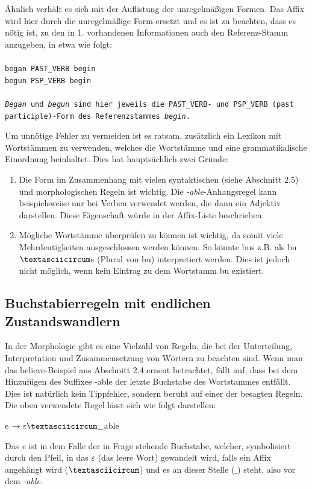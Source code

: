 \documentclass[12pt]{report}
\begin{document}
Ähnlich verhält es sich mit der Auflistung der unregelmäßigen Formen. Das Affix wird hier durch die unregelmäßige Form ersetzt und es ist zu beachten, dass es nötig ist, zu den in 1. vorhandenen Informationen auch den Referenz-Stamm anzugeben, in etwa wie folgt:
\\
\tt\\
began PAST\_VERB begin\\
begun PSP\_VERB begin\\
\rm\\
\textit{\glqq  Began\grqq{}} und \textit{\glqq  begun\grqq{}} sind hier jeweils die \glqq  PAST\_VERB\grqq{}- und \glqq  PSP\_VERB\grqq{} (past participle)-Form des Referenzstammes \textit{\glqq  begin\grqq{}}.

Um unnötige Fehler zu vermeiden ist es ratsam, zusätzlich ein Lexikon mit Wortstämmen zu verwenden, welches die Wortstämme und eine grammatikalische Einordnung beinhaltet. Dies hat hauptsächlich zwei Gründe: 

\begin{enumerate}
\item Die Form im Zusammenhang mit vielen syntaktischen (siehe Abschnitt 2.5) und morphologischen Regeln ist wichtig. Die \textit{\glqq  -able\grqq{}}-Anhangsregel kann beispielsweise nur bei Verben verwendet werden, die dann ein Adjektiv darstellen. Diese Eigenschaft würde in der Affix-Liste beschrieben.
\item Mögliche Wortstämme überprüfen zu können ist wichtig, da somit viele Mehrdeutigkeiten ausgeschlossen werden können. So könnte \glqq  bus\grqq{} z.B. als \glqq  bu$\textasciicircum$s\grqq{} (Plural von \glqq  bu\grqq{}) interpretiert werden. Dies ist jedoch nicht möglich, wenn kein Eintrag zu dem Wortstamm \glqq  bu\grqq{} existiert. 
\end{enumerate}

\subsection{Buchstabierregeln mit endlichen\\ Zustandswandlern}
In der Morphologie gibt es eine Vielzahl von Regeln, die bei der Unterteilung, Interpretation und Zusammensetzung von Wörtern zu beachten sind. Wenn man das \glqq  believe\grqq{}-Beispiel aus Abschnitt 2.4 erneut betrachtet, fällt auf, dass bei dem Hinzufügen des Suffixes \glqq  -able\grqq{} der letzte Buchstabe des Wortstammes entfällt. Dies ist natürlich kein Tippfehler, sondern beruht auf einer der besagten Regeln. Die oben verwendete Regel lässt sich wie folgt darstellen:
\tt
\begin{center}
e $\rightarrow \varepsilon \textasciicircum \_$able
\end{center}
\rm
Das \textit{e} ist in dem Falle der in Frage stehende Buchstabe, welcher, symbolisiert durch den Pfeil, in das $\varepsilon$ (das leere Wort) gewandelt wird, falls ein Affix angehängt wird ($\textasciicircum$) und es an dieser Stelle ($\_$) steht, also vor dem \textit{\glqq  -able\grqq{}}.
\end{document}
